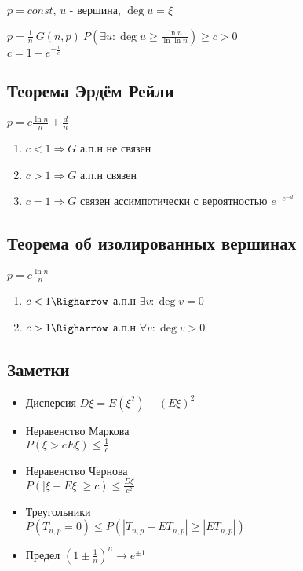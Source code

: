 \documentclass{article}
\begin{document}
\(p = const\), \(u\) - вершина, \(\deg u = \xi\)

\(p = \frac{1}{n}\ G(n, p)\ P(\exists u: \deg u \ge \frac{\ln n}{\ln\ln n}) \ge c > 0\) \\
\(c = 1 - e^{-\frac{1}{e}}\)

\subsection{Теорема Эрдём Рейли}
\label{sec:org01932b3}
\(p = c\frac{\ln n}{n} + \frac{d}{n}\) \\
\begin{enumerate}
\item \(c < 1 \Rightarrow G\) а.п.н не связен
\item \(c > 1 \Rightarrow G\) а.п.н связен
\item \(c = 1 \Rightarrow G\) связен ассимпотически с вероятностью \(e^{-e^{-d}}\)
\end{enumerate}

\subsection{Теорема об изолированных вершинах}
\label{sec:org869e774}
\(p = c\frac{\ln n}{n}\)
\begin{enumerate}
\item \(c < 1 \Righarrow\) а.п.н \(\exists v: \deg v = 0\)
\item \(c > 1 \Righarrow\) а.п.н \(\forall v: \deg v > 0\)
\end{enumerate}

\subsection{Заметки}
\label{sec:org44edf24}
\begin{itemize}
\item Дисперсия
\(D\xi = E(\xi^2) - (E\xi)^2\)
\item Неравенство Маркова \\
\(P(\xi > cE\xi) \le \frac{1}{c}\)
\item Неравенство Чернова \\
\(P(|\xi - E\xi| \ge c) \le \frac{D\xi}{c^2}\)
\item Треугольники \\
\(P(T_{n,p} = 0) \le P(|T_{n,p} - ET_{n,p}| \ge |ET_{n,p}|)\)
\item Предел
\((1 \pm \frac{1}{n})^n \to e^{\pm 1}\)
\end{itemize}
\end{document}
